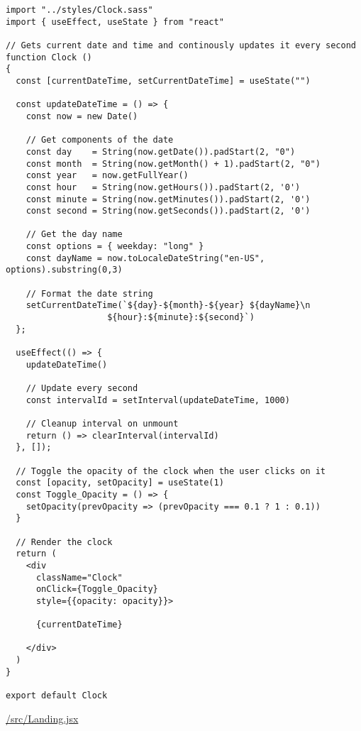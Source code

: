\begin{verbatim}
import "../styles/Clock.sass"
import { useEffect, useState } from "react"

// Gets current date and time and continously updates it every second
function Clock ()
{
  const [currentDateTime, setCurrentDateTime] = useState("")

  const updateDateTime = () => {
    const now = new Date()

    // Get components of the date
    const day    = String(now.getDate()).padStart(2, "0")
    const month  = String(now.getMonth() + 1).padStart(2, "0")
    const year   = now.getFullYear()
    const hour   = String(now.getHours()).padStart(2, '0')
    const minute = String(now.getMinutes()).padStart(2, '0')
    const second = String(now.getSeconds()).padStart(2, '0')
    
    // Get the day name
    const options = { weekday: "long" }
    const dayName = now.toLocaleDateString("en-US", options).substring(0,3)

    // Format the date string
    setCurrentDateTime(`${day}-${month}-${year} ${dayName}\n
	                ${hour}:${minute}:${second}`)
  };

  useEffect(() => {
    updateDateTime()

    // Update every second
    const intervalId = setInterval(updateDateTime, 1000) 
    
    // Cleanup interval on unmount
    return () => clearInterval(intervalId)
  }, []);

  // Toggle the opacity of the clock when the user clicks on it
  const [opacity, setOpacity] = useState(1)
  const Toggle_Opacity = () => {
    setOpacity(prevOpacity => (prevOpacity === 0.1 ? 1 : 0.1))
  }
  
  // Render the clock
  return (
    <div
      className="Clock"
      onClick={Toggle_Opacity}
      style={{opacity: opacity}}>

      {currentDateTime}

    </div>
  )
}

export default Clock
\end{verbatim}

\underline{/src/Landing.jsx}

